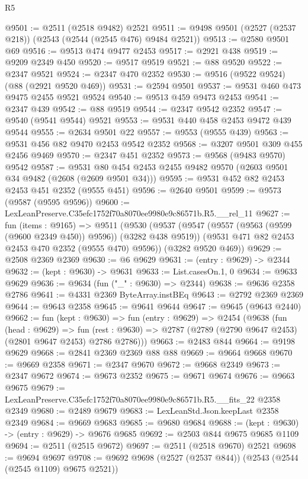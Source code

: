 \begin{lexlean}{R5}
\begin{coremodule}
@9501 := @2511 (@2518 @9482) @2521
@9511 := @9498 @9501 (@2527 (@2537 @218)) (@2543 (@2544 (@2545 @476) @9484 @2521))
@9513 := @2580 @9501 @69
@9516 := @9513 @474 @9477 @2453
@9517 := @2921 @438
@9519 := @9209 @2349 @450
@9520 := @9517 @9519
@9521 := @88 @9520
@9522 := @2347 @9521
@9524 := @2347 @470 @2352
@9530 := @9516 (@9522 @9524) (@88 (@2921 @9520 @469))
@9531 := @2594 @9501
@9537 := @9531 @460 @473 @9475 @2455 @9521 @9524
@9540 := @9513 @459 @9473 @2453
@9541 := @2347 @439
@9542 := @88 @9519
@9544 := @2347 @9542 @2352
@9547 := @9540 (@9541 @9544) @9521
@9553 := @9531 @440 @458 @2453 @9472 @439 @9544
@9555 := @2634 @9501 @22
@9557 := @9553 (@9555 @439)
@9563 := @9531 @456 @82 @9470 @2453 @9542 @2352
@9568 := @3207 @9501 @309 @455 @2456 @9469
@9570 := @2347 @451 @2352
@9573 := @9568 (@9483 @9570) @9542
@9587 := @9531 @80 @454 @2453 @2455 @9482 @9570 (@2603 @9501 @34 @9482 (@2608 (@2609 @9501 @34)))
@9595 := @9531 @452 @82 @2453 @2453 @451 @2352 (@9555 @451)
@9596 := @2640 @9501
@9599 := @9573 (@9587 (@9595 @9596))
@9600 := LexLeanPreserve.C35efc1752f70a8070ee9980e9c86571b.R5.__rel_11
@9627 := fun (items : @9165) =>
  @9511
    (@9530
      (@9537
        (@9547 (@9557 (@9563 (@9599 (@9600 @2349 @450)) @9596)) (@3282 @438 @9519))
        (@9531 @471 @82 @2453 @2453 @470 @2352 (@9555 @470) @9596))
      (@3282 @9520 @469))
@9629 := @2508 @2369 @2369
@9630 := @6 @9629
@9631 := (entry : @9629) -> @2344
@9632 := (kept : @9630) -> @9631
@9633 := List.casesOn.{1, 0}
@9634 := @9633 @9629
@9636 := @9634 (fun ("_" : @9630) => @2344)
@9638 := @9636 @2358 @2786
@9641 := @4331 @2369 ByteArray.instBEq
@9643 := @2792 @2369 @2369
@9644 := @9643 @2358
@9645 := @9641 @9644
@9647 := @9645 (@9643 @2440)
@9662 := fun (kept : @9630) =>
  fun (entry : @9629) =>
  @2454
    (@9638
      (fun (head : @9629) =>
      fun (rest : @9630) => @2787 (@2789 (@2790 @9647 @2453) (@2801 @9647 @2453) @2786 @2786)))
@9663 := @2483 @844
@9664 := @9198 @9629
@9668 := @2841 @2369 @2369 @88 @88
@9669 := @9664 @9668
@9670 := @9669 @2358
@9671 := @2347 @9670
@9672 := @9668 @2349
@9673 := @2347 @9672
@9674 := @9673 @2352
@9675 := @9671 @9674
@9676 := @9663 @9675
@9679 := LexLeanPreserve.C35efc1752f70a8070ee9980e9c86571b.R5.__fits_22 @2358 @2349
@9680 := @2489 @9679
@9683 := LexLeanStd.Json.keepLast @2358 @2349
@9684 := @9669 @9683
@9685 := @9680 @9684
@9688 := (kept : @9630) -> (entry : @9629) -> @9676 @9685
@9692 := @2503 @844 @9675 @9685 @1109
@9694 := @2511 (@2515 @9672)
@9697 := @2511 (@2518 @9670) @2521
@9698 := @9694 @9697
@9708 := @9692 @9698 (@2527 (@2537 @844)) (@2543 (@2544 (@2545 @1109) @9675 @2521))

\end{coremodule}
\end{lexlean}
